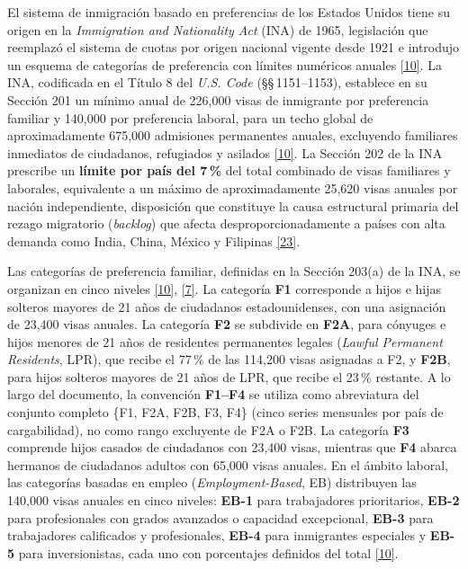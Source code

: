 \documentclass[12pt,letterpaper]{report}
\newcommand{\cita}[1]{\hyperref[bib:#1]{[#1]}}
\begin{document}
El sistema de inmigración basado en preferencias de los Estados Unidos tiene su origen en la \textit{Immigration and Nationality Act} (INA) de 1965, legislación que reemplazó el sistema de cuotas por origen nacional vigente desde 1921 e introdujo un esquema de categorías de preferencia con límites numéricos anuales \cita{10}. La INA, codificada en el Título 8 del \textit{U.S. Code} (\S\S\,1151--1153), establece en su Sección 201 un mínimo anual de 226,000 visas de inmigrante por preferencia familiar y 140,000 por preferencia laboral, para un techo global de aproximadamente 675,000 admisiones permanentes anuales, excluyendo familiares inmediatos de ciudadanos, refugiados y asilados \cita{10}. La Sección 202 de la INA prescribe un \textbf{límite por país del 7\,\%} del total combinado de visas familiares y laborales, equivalente a un máximo de aproximadamente 25,620 visas anuales por nación independiente, disposición que constituye la causa estructural primaria del rezago migratorio (\textit{backlog}) que afecta desproporcionadamente a países con alta demanda como India, China, México y Filipinas \cita{23}.

Las categorías de preferencia familiar, definidas en la Sección 203(a) de la INA, se organizan en cinco niveles \cita{10}, \cita{7}. La categoría \textbf{F1} corresponde a hijos e hijas solteros mayores de 21 años de ciudadanos estadounidenses, con una asignación de 23,400 visas anuales. La categoría \textbf{F2} se subdivide en \textbf{F2A}, para cónyuges e hijos menores de 21 años de residentes permanentes legales (\textit{Lawful Permanent Residents}, LPR), que recibe el 77\,\% de las 114,200 visas asignadas a F2, y \textbf{F2B}, para hijos solteros mayores de 21 años de LPR, que recibe el 23\,\% restante. A lo largo del documento, la convención \textbf{F1--F4} se utiliza como abreviatura del conjunto completo \{F1, F2A, F2B, F3, F4\} (cinco series mensuales por país de cargabilidad), no como rango excluyente de F2A o F2B. La categoría \textbf{F3} comprende hijos casados de ciudadanos con 23,400 visas, mientras que \textbf{F4} abarca hermanos de ciudadanos adultos con 65,000 visas anuales. En el ámbito laboral, las categorías basadas en empleo (\textit{Employment-Based}, EB) distribuyen las 140,000 visas anuales en cinco niveles: \textbf{EB-1} para trabajadores prioritarios, \textbf{EB-2} para profesionales con grados avanzados o capacidad excepcional, \textbf{EB-3} para trabajadores calificados y profesionales, \textbf{EB-4} para inmigrantes especiales y \textbf{EB-5} para inversionistas, cada uno con porcentajes definidos del total \cita{10}.
\end{document}
